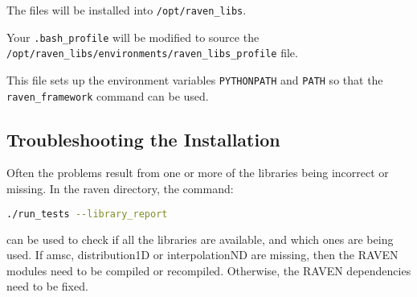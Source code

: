 The files will be installed into \texttt{/opt/raven\_libs}.

Your \texttt{.bash\_profile} will be modified to source the\\
\texttt{/opt/raven\_libs/environments/raven\_libs\_profile} file.

This file sets up the environment variables \texttt{PYTHONPATH} and
\texttt{PATH} so that the \texttt{raven\_framework} command can be used.

\subsection{Troubleshooting the Installation}
\label{troubleshooting_installation}

Often the problems result from one or more of the libraries being
incorrect or missing.  In the raven directory, the command:

\begin{lstlisting}[language=bash]
./run_tests --library_report
\end{lstlisting}
can be used to check if all the libraries are available, and which
ones are being used.  If amsc, distribution1D or interpolationND are
missing, then the RAVEN modules need to be compiled or recompiled.
Otherwise, the RAVEN dependencies need to be fixed.


